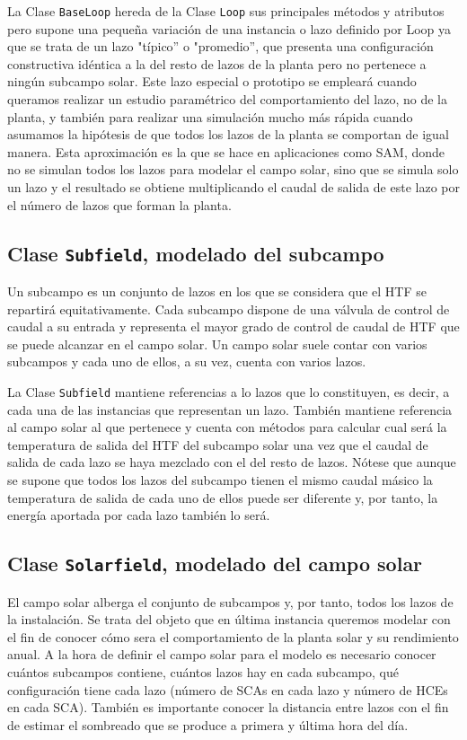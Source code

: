 La Clase \texttt{BaseLoop} hereda de la Clase \texttt{Loop} sus principales métodos y atributos pero supone una pequeña variación de una instancia o lazo definido por Loop ya que se trata de un lazo  "típico'' o "promedio'', que presenta una configuración constructiva idéntica a la del resto de lazos de la planta pero no pertenece a ningún subcampo solar. Este lazo especial o prototipo se empleará cuando queramos realizar un estudio paramétrico del comportamiento del lazo, no de la planta, y también para realizar una simulación mucho más rápida cuando asumamos la hipótesis de que todos los lazos de la planta se comportan de igual manera. Esta aproximación es la que se hace en aplicaciones como SAM, donde no se simulan todos los lazos para modelar el campo solar, sino que se simula solo un lazo y el resultado se obtiene multiplicando el caudal de salida de este lazo por el número de lazos que forman la planta. 

\subsection{Clase \texttt{Subfield}, modelado del subcampo}
\label{subfield}

Un subcampo es un conjunto de lazos en los que se considera que el HTF se repartirá equitativamente. Cada subcampo dispone de una válvula de control de caudal a su entrada y representa el mayor grado de control de caudal de HTF que se puede alcanzar en el campo solar. Un campo solar suele contar con varios subcampos y cada uno de ellos, a su vez, cuenta con varios lazos.  

La Clase \texttt{Subfield} mantiene referencias a lo lazos que lo constituyen, es decir, a cada una de las instancias que representan un lazo. También mantiene referencia al campo solar al que pertenece y cuenta con métodos para calcular cual será la temperatura de salida del HTF del subcampo solar una vez que el caudal de salida de cada lazo se haya mezclado con el del resto de lazos. Nótese que aunque se supone que todos los lazos del subcampo tienen el mismo caudal másico la temperatura de salida de cada uno de ellos puede ser diferente y, por tanto, la energía aportada por cada lazo también lo será. 

\subsection{Clase \texttt{Solarfield}, modelado del campo solar}
\label{solarfield}

El campo solar alberga el conjunto de subcampos y, por tanto, todos los lazos de la instalación. Se trata del objeto que en última instancia queremos modelar con el fin de conocer cómo sera el comportamiento de la planta solar y su rendimiento anual. A la hora de definir el campo solar para el modelo es necesario conocer cuántos subcampos contiene, cuántos lazos hay en cada subcampo, qué configuración tiene cada lazo (número de SCAs en cada lazo y número de HCEs en cada SCA). También es importante conocer la distancia entre lazos con el fin de estimar el sombreado que se produce a primera y última hora del día. 

